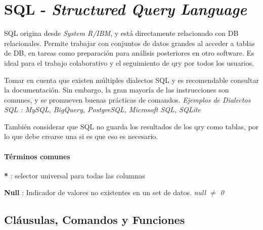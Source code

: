 
\section{SQL - \textit{Structured Query Language}}
SQL origina desde \textit{System R/IBM}, y está directamente relacionado con DB relacionales. Permite trabajar con conjuntos de datos grandes al acceder a tablas de DB, en tareas como preparación para análisis posteriores en otro software. Es ideal para el trabajo colaborativo y el seguimiento de \gls{qry} por todos los usuarios.

Tomar en cuenta que existen múltiples dialectos SQL y es recomendable consultar la documentación. Sin embargo, la gran mayoría de las instrucciones son comunes, y se promueven buenas prácticas de comandos. \textit{Ejemplos de Dialectos SQL : MySQL, BigQuery, PostgreSQL, Microsoft SQL, SQLite}

También considerar que SQL no guarda los resultados de los \gls{qry} como tablas, por lo que debe crearse una si es que eso es necesario.

\paragraph{Términos comunes}
\begin{description}
    \item {\textbf{*} : selector universal para todas las columnas}
    \item {\textbf{Null} : Indicador de valores no existentes en un set de datos. \textit{null ${\neq}$ 0}} 
\end{description}

\subsection{Cláusulas, Comandos y Funciones}
